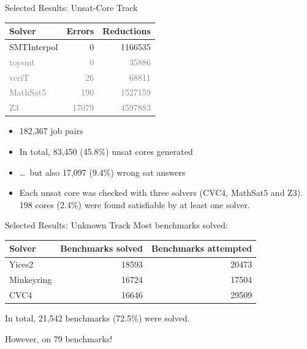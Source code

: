 \documentclass{beamer}
\begin{document}
\begin{frame}{Selected Results: Unsat-Core Track}
  \begin{tabular}{lrr}
    Solver & Errors & Reductions \\ \hline
    SMTInterpol                & 0                       & 1166535 \\
    \textcolor{gray}{toysmt}   & \textcolor{gray}{0}     & \textcolor{gray}{35886} \\
    \textcolor{gray}{veriT}    & \textcolor{gray}{26}    & \textcolor{gray}{68811} \\
    \textcolor{gray}{MathSat5} & \textcolor{gray}{190}   & \textcolor{gray}{1527159} \\
    \textcolor{gray}{Z3}       & \textcolor{gray}{17079} & \textcolor{gray}{4597883}
  \end{tabular}
  \bigskip

  \begin{itemize}
  \item 182,367 job pairs
    \medskip
  \item In total, 83,450 (45.8\%) unsat cores generated
  \item \ldots\ but also 17,097 (9.4\%) wrong sat answers
    \medskip
  \item Each unsat core was checked with three solvers (CVC4, MathSat5
    and Z3).  198 cores (2.4\%) were found satisfiable by at least one
    solver.
  \end{itemize}
\end{frame}


\begin{frame}{Selected Results: Unknown Track}
  Most benchmarks solved:

  \bigskip

  \begin{tabular}{lrr}
    Solver      & Benchmarks solved & Benchmarks attempted \\ \hline
    Yices2      & 18593             & 20473 \\
    Minkeyring  & 16724             & 17504 \\
    CVC4        & 16646             & 29509
  \end{tabular}

  \bigskip
  \bigskip
  \bigskip

  In total, 21,542 benchmarks (72.5\%) were solved.

  \medskip
  
  However,  on 79 benchmarks!
\end{frame}
\end{document}
